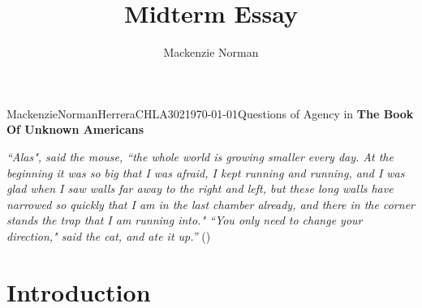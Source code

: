 \documentclass{article}
\title{Midterm Essay}
\author{Mackenzie Norman}
\begin{document}
\begin{mla}{Mackenzie}{Norman}{Herrera}{CHLA302}{\today}{Questions of Agency in \textbf{The Book Of Unknown Americans}}

\noindent\textit{``Alas", said the mouse, ``the whole world is growing smaller every day. At the beginning it was so big that I was afraid, I kept running and running, and I was glad when I saw walls far away to the right and left, but these long walls have narrowed so quickly that I am in the last chamber already, and there in the corner stands the trap that I am running into." \linebreak \linebreak ``You only need to change your direction," said the cat, and ate it up.''} (\cite{eine-fable})

\section*{Introduction}

\end{mla}
\end{document}
